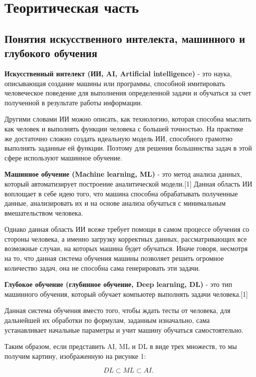 \documentclass[bachelor, och, coursework]{shiza}
\begin{document}
\section{Теоритическая часть}

\subsection{Понятия искусственного интелекта, машинного и глубокого обучения}

\textbf{Искусственный интелект (ИИ, AI, Artificial intelligence)} - это наука, описывающая создание машины или программы,
способной имитировать человеческое поведение для выполнения определенной задачи и обучаться за счет полученной в результате
работы информации.

Другими словами ИИ можно описать, как технологию, которая способна мыслить как человек и выполнять функции человека с большей
точностью. На практике же достаточно сложно создать идеальную модель ИИ, способного грамотно выполнять заданные ей функции. 
Поэтому для решения большинства задач в этой сфере используют машинное обучение.

\textbf{Машинное обучение (Machine learning, ML)} - это метод анализа данных, который автоматизирует построение аналитической 
модели.[1] Данная область ИИ воплощает в себе идею того, что машина способна обрабатывать полученные данные, анализировать их 
и на основе анализа обучаться с минимальным вмешательством человека.

Однако данная область ИИ всеже требует помощи в самом процессе обучения со стороны человека, а именно загрузку корректных данных,
рассматривающих все возможные случаи, на которых машина будет обучаться. Иначе говоря, несмотря на то, что данная система обучения
машины позволяет решить огромное количество задач, она не способна сама генерировать эти задачи.

\textbf{Глубокое обучение (глубинное обучение, Deep learning, DL)} - это тип машинного обучения, который обучает компьютер выполнять 
задачи человека.[1]

Данная система обучения вместо того, чтобы ждать тесты от человека, для дальнейшей их обработки по формулам, заданным изначально,
сама устанавливает начальные параметры и учит машину обучаться самостоятельно.

Таким образом, если представить AI, ML и DL в виде трех множеств, то мы получим картину, изображенную на рисунке 1:

\begin{equation}
    DL \subset ML \subset AI. 
\end{equation}
\end{document}

